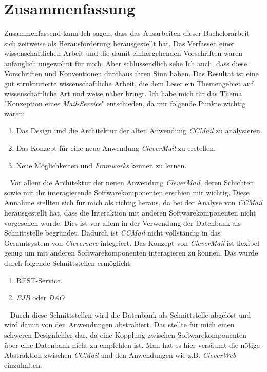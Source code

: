 
\chapter{Zusammenfassung}
Zusammenfassend kann Ich sagen, dass das Ausarbeiten dieser Bachelorarbeit sich zeitweise als Herausforderung herausgestellt hat. Das Verfassen einer wissenschaftlichen Arbeit und die damit einhergehenden Vorschriften waren anfänglich ungewohnt für mich. Aber schlussendlich sehe Ich auch, dass diese Vorschriften und Konventionen durchaus ihren Sinn haben. Das Resultat ist eine gut strukturierte wissenschaftliche Arbeit, die dem Leser ein Themengebiet auf wissenschaftliche Art und weise näher bringt.
\newline
\newline
Ich habe mich für das Thema "Konzeption eines \emph{Mail-Service}" entschieden, da mir folgende Punkte wichtig waren:
\begin{enumerate}
	\item Das Design und die Architektur der alten Anwendung \emph{CCMail} zu analysieren.
	\item Das Konzept für eine neue Anwendung \emph{CleverMail} zu erstellen.
	\item Neue Möglichkeiten und \emph{Framworks} kennen zu lernen.
\end{enumerate}
\ \newline
Vor allem die Architektur der neuen Anwendung \emph{CleverMail}, deren Schichten sowie mit ihr interagierende Softwarekomponenten erschien mir wichtig. Diese Annahme stellten sich für mich als richtig heraus, da bei der Analyse von \emph{CCMail} herausgestellt hat, dass die Interaktion mit anderen Softwarekomponenten nicht vorgesehen wurde. Dies ist vor allem in der Verwendung der Datenbank als Schnittstelle begründet. Dadurch ist \emph{CCMail} nicht vollständig in das Gesamtsystem von \emph{Clevercure} integriert.
\newline
\newline
Das Konzept von \emph{CleverMail} ist flexibel genug um mit anderen Softwarekomponenten interagieren zu können. Das wurde durch folgende Schnittstellen ermöglicht:
\begin{enumerate}
	\item REST-Service.
	\item \emph{EJB} oder \emph{DAO}
\end{enumerate}
\ \newline
Durch diese Schnittstellen wird die Datenbank als Schnittstelle abgelöst und wird damit von den Anwendungen abstrahiert. Das stellte für mich einen schweren Designfehler dar, da eine Kopplung zwischen Softwarekomponenten über eine Datenbank nicht zu empfehlen ist. Man hat es hier versäumt die nötige Abstraktion zwischen \emph{CCMail} und den Anwendungen wie z.B. \emph{CleverWeb} einzuhalten.
